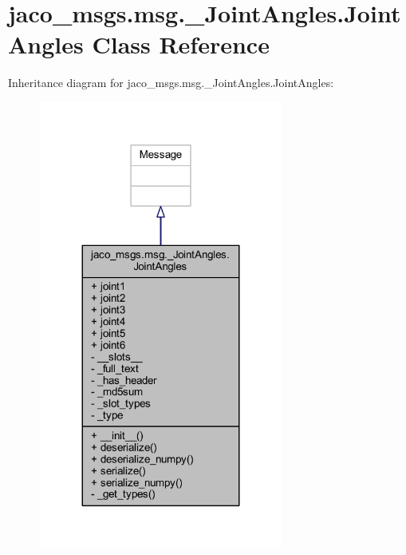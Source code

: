 \hypertarget{classjaco__msgs_1_1msg_1_1__JointAngles_1_1JointAngles}{}\section{jaco\+\_\+msgs.\+msg.\+\_\+\+Joint\+Angles.\+Joint\+Angles Class Reference}
\label{classjaco__msgs_1_1msg_1_1__JointAngles_1_1JointAngles}


Inheritance diagram for jaco\+\_\+msgs.\+msg.\+\_\+\+Joint\+Angles.\+Joint\+Angles\+:
\nopagebreak
\begin{figure}[H]
\begin{center}
\leavevmode
\includegraphics[width=227pt]{dd/d71/classjaco__msgs_1_1msg_1_1__JointAngles_1_1JointAngles__inherit__graph}
\end{center}
\end{figure}


